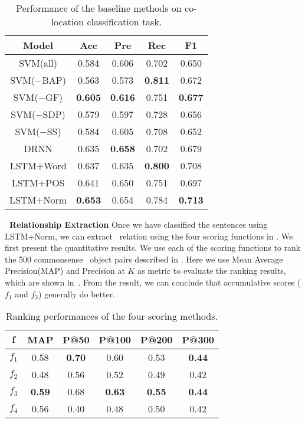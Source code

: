 \begin{table}[th!]
\small
	\centering
	
	\begin{tabular}{|c|c|c|c|c|}
		\hline
	\textbf{Model}	& \textbf{Acc} & \textbf{Pre} & \textbf{Rec} & \textbf{F1} \\		\hline \hline
	SVM(all) &	0.584 & 0.606 & 0.702  & 0.650  \\		\hline
	SVM($-$BAP)	& 0.563 &  0.573& \textbf{0.811}  & 0.672 \\		\hline
	SVM($-$GF)	&  \textbf{0.605} & \textbf{0.616} &0.751  & \textbf{0.677} \\		\hline
	SVM($-$SDP)	& 0.579 & 0.597 & 0.728  & 0.656\\		\hline
	SVM($-$SS)	&  0.584 &  0.605 &  0.708 & 	0.652	\\ \hline
	\hline
	DRNN	&  0.635 &  \textbf{0.658} &  0.702 & 	0.679	\\ \hline
	LSTM$+$Word 	&   0.637 & 0.635 & \textbf{0.800}   & 	 0.708	\\ \hline
	LSTM$+$POS	& 0.641 & 0.650  &  0.751 & 0.697	\\ \hline
	LSTM$+$Norm	&  \textbf{0.653 }&  0.654 & { 0.784} & 	\textbf{0.713}	\\ \hline
	\end{tabular}
	\caption{Performance of the baseline methods 
	on co-location classification task.}
	\label{tab:aprf}
\end{table}

\noindent
\textbf{\lnear\ Relationship Extraction}
Once we have classified the sentences using LSTM+Norm, we can extract \lnear\
relation using the four scoring functions in .
We first present the quantitative results. 
We use each of the scoring functions to 
rank the 500 commonsense \lnear\ object pairs described in . 
Here we use Mean Average Precision(MAP) and Precision at $K$ as metric 
to evaluate the ranking results, which are shown in~\tabref{tab:3m}.
From the result, we can conclude that accumulative scores ($f_1$ and $f_3$)
generally do better.
\begin{table}[th!]
\small
\centering
\begin{tabular}{|c|c|c|c|c|c|}
\hline
$\mathbf{f}$	& \textbf{MAP} & \textbf{P@50} & \textbf{P@100}  &  \textbf{P@200}& \textbf{P@300}\\ \hline \hline
	$f_1$	& 0.58  & {\bf 0.70} & 0.60& 0.53 & {\bf 0.44}\\\hline
	$f_2$	& 0.48 & 0.56 & 0.52  & 0.49 & 0.42\\\hline
	$f_3$	& {\bf 0.59} & 0.68& {\bf 0.63} & {\bf 0.55} & {\bf 0.44}\\\hline
	$f_4$	& 0.56 & 0.40 & 0.48 & 0.50 & 0.42\\\hline
	\end{tabular}
\caption{Ranking performances of the four scoring methods.}
\label{tab:3m}
\end{table}

